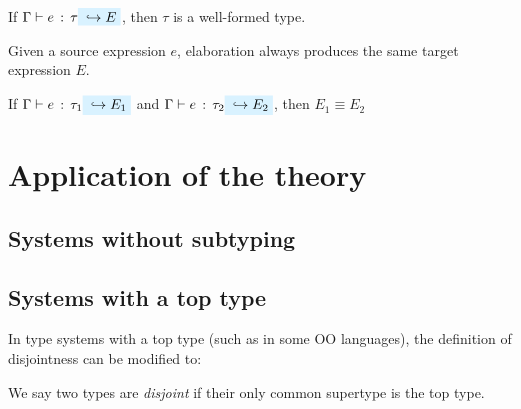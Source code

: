 \documentclass[preprint]{sigplanconf}
\begin{document}
\begin{lemma} \label{wf-typing}
If $\hastype \Gamma e \tau \yields E$, then $\tau$ is a well-formed type.
\end{lemma}

Given a source expression $e$, elaboration always produces the same target expression $E$.

\begin{theorem} \label{unique-elaboration}
If $\hastype \Gamma e {\tau_1} \yields {E_1}$ and $\hastype \Gamma e {\tau_2} \yields {E_2}$, then $E_1 \equiv E_2$
\end{theorem}

\section{Application of the theory}

\subsection{Systems without subtyping}

\subsection{Systems with a top type}

In type systems with a top type (such as \lstinline@Object@ in some OO languages), the definition of disjointness can be modified to:

We say two types are \emph{disjoint} if their only common supertype is the top type.
\end{document}
